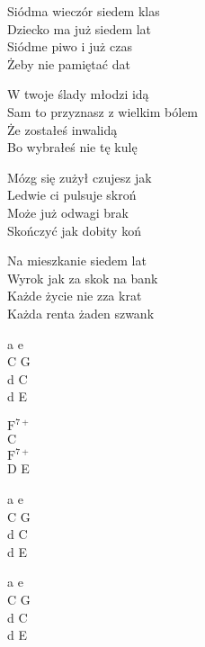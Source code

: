 \begin{text}
    Siódma wieczór siedem klas\\
    Dziecko ma już siedem lat\\
    Siódme piwo i już czas\\
    Żeby nie pamiętać dat

    \vin W twoje ślady młodzi idą\\
    \vin Sam to przyznasz z wielkim bólem\\
    \vin Że zostałeś inwalidą\\
    \vin Bo wybrałeś nie tę kulę

    Mózg się zużył czujesz jak\\
    Ledwie ci pulsuje skroń\\
    Może już odwagi brak\\
    Skończyć jak dobity koń

    Na mieszkanie siedem lat\\
    Wyrok jak za skok na bank\\
    Każde życie nie zza krat\\
    Każda renta żaden szwank
\end{text}
\begin{chord}
    a e\\
    C G\\
    d C\\
    d E

    $\mathrm{F^{7+}}$\\
    C\\
    $\mathrm{F^{7+}}$\\
    D E

    a e\\
    C G\\
    d C\\
    d E

    a e\\
    C G\\
    d C\\
    d E
\end{chord}
